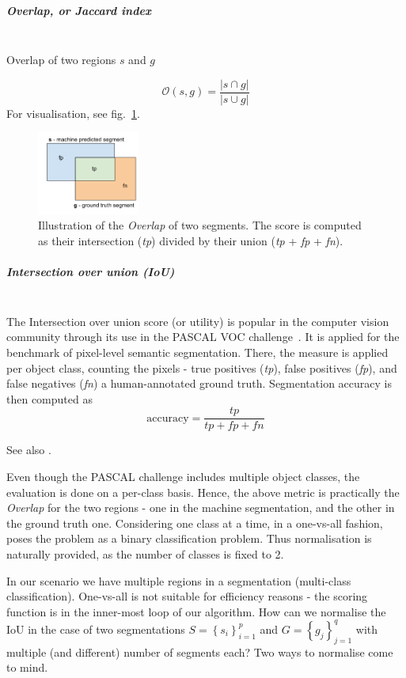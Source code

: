 \subparagraph*{Overlap, or Jaccard index}\mbox{}\\
Overlap of two regions %
$s$ and $g$

\[
\mathcal{O}\left(s,g\right)=\frac{\left|s\cap g\right|}{\left|s\cup g\right|}
\]
For visualisation, see fig.~\ref{fig:overlap-IoU}.

\begin{figure}[ht!]
\centering
\includegraphics[width=0.3\textwidth]{images/scoring_fcns/intersection-over-union_score_illustrated.png}
\caption{Illustration of the \textit{Overlap} of two segments. The score is computed as their intersection (\textit{tp}) divided by their union (\textit{tp} + \textit{fp} + \textit{fn}).}
\label{fig:overlap-IoU}
\end{figure}

\subparagraph*{Intersection over union (IoU)}\mbox{}\\
The Intersection over union score (or utility) %
is popular in the computer vision community through its use in the PASCAL VOC challenge~\cite{pascal-voc-2012}. It is applied for the benchmark of pixel-level semantic segmentation. There, the measure is applied per object class, counting the pixels - true positives (\textit{tp}), false positives (\textit{fp}), and false negatives (\textit{fn}) \wrt a human-annotated ground truth. Segmentation accuracy is then computed as
\[
 \text{accuracy} = \frac{\textit{tp}}{\textit{tp} + \textit{fp} + \textit{fn}}
\]

See also .

Even though the PASCAL challenge includes multiple object classes, the evaluation is done on a per-class basis. Hence, the above metric is practically the {\it Overlap} for the two regions - one in the machine segmentation, and the other in the ground truth one. 
Considering one class at a time, in a one-vs-all fashion, poses the problem as a binary classification problem. Thus normalisation is naturally provided, as the number of classes is fixed to 2.

In our scenario we have multiple regions in a segmentation (multi-class classification). One-vs-all is not suitable for efficiency reasons - the scoring function is in the inner-most loop of our algorithm. How can we normalise the IoU in the case of two segmentations $S=\left\{ {s_{i}}\right\} _{i=1}^{p}$
and $G=\left\{ {g_{j}}\right\} _{j=1}^{q}$ with multiple (and different) number of segments each? Two ways to normalise come to mind.

